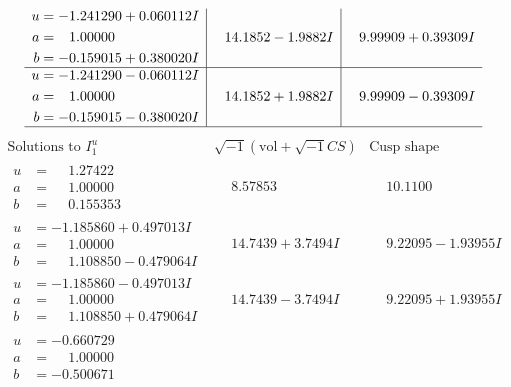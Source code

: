 \documentclass[1p]{elsarticle_modified}
\theoremstyle{definition}
\newcommand{\I}{\sqrt{-1}}
\begin{document}
$$\begin{array}{c|c|c}
\begin{aligned}
u &= -1.241290 + 0.060112 I \\
a &= \phantom{-}1.00000\phantom{ +0.000000I} \\
b &= -0.159015 + 0.380020 I\end{aligned}
 & \phantom{-}14.1852 - 1.9882 I & \phantom{-}9.99909 + 0.39309 I \\ \hline\begin{aligned}
u &= -1.241290 - 0.060112 I \\
a &= \phantom{-}1.00000\phantom{ +0.000000I} \\
b &= -0.159015 - 0.380020 I\end{aligned}
 & \phantom{-}14.1852 + 1.9882 I & \phantom{-}9.99909 - 0.39309 I\\
 \hline 
 \end{array}$$\newpage$$\begin{array}{c|c|c}  
\text{Solutions to }I^u_{1}& \I (\text{vol} + \sqrt{-1}CS) & \text{Cusp shape}\\
 \hline 
\begin{aligned}
u &= \phantom{-}1.27422\phantom{ +0.000000I} \\
a &= \phantom{-}1.00000\phantom{ +0.000000I} \\
b &= \phantom{-}0.155353\phantom{ +0.000000I}\end{aligned}
 & \phantom{-}8.57853\phantom{ +0.000000I} & \phantom{-}10.1100\phantom{ +0.000000I} \\ \hline\begin{aligned}
u &= -1.185860 + 0.497013 I \\
a &= \phantom{-}1.00000\phantom{ +0.000000I} \\
b &= \phantom{-}1.108850 - 0.479064 I\end{aligned}
 & \phantom{-}14.7439 + 3.7494 I & \phantom{-}9.22095 - 1.93955 I \\ \hline\begin{aligned}
u &= -1.185860 - 0.497013 I \\
a &= \phantom{-}1.00000\phantom{ +0.000000I} \\
b &= \phantom{-}1.108850 + 0.479064 I\end{aligned}
 & \phantom{-}14.7439 - 3.7494 I & \phantom{-}9.22095 + 1.93955 I \\ \hline\begin{aligned}
u &= -0.660729\phantom{ +0.000000I} \\
a &= \phantom{-}1.00000\phantom{ +0.000000I} \\
b &= -0.500671\phantom{ +0.000000I}\end{aligned}

\end{array}$$
\end{document}
